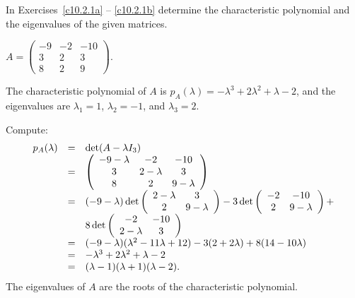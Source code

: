 \documentclass{ximera}
\begin{document}
\noindent In Exercises~\ref{c10.2.1a} -- \ref{c10.2.1b} determine the 
characteristic polynomial and the eigenvalues of the given matrices.
\begin{exercise} \label{c10.2.1a}
$A = \left(\begin{array}{rrr} -9 & -2 & -10 \\ 3 & 2 & 3 \\
8 & 2 & 9 \end{array}\right)$. 

\begin{solution}

\ans The characteristic polynomial of $A$ is $p_A(\lambda) =
-\lambda^3 + 2\lambda^2 + \lambda - 2$, and the eigenvalues are
$\lambda_1 = 1$, $\lambda_2 = -1$, and $\lambda_3 = 2$.

\soln Compute:
\[
\begin{array}{rcl}
p_A(\lambda) & = & \det(A - \lambda I_3) \\
& = & \left(\begin{array}{ccc} -9 - \lambda & -2 & -10 \\ 3 & 2 - \lambda & 3 \\ 8 & 2 & 9 - \lambda\end{array}\right) \\
& = & (-9 - \lambda)\det\left(\begin{array}{cc} 2 - \lambda & 3\\ 2 &9 - \lambda\end{array}\right)
- 3\det\left(\begin{array}{cc} -2 & -10\\ 2 &9 - \lambda\end{array}\right) + \\
& & 8\det\left(\begin{array}{cc} -2 & -10\\ 2 - \lambda &3\end{array}\right) \\
& = & (-9 - \lambda)(\lambda^2 - 11\lambda + 12)
- 3(2 + 2\lambda) + 8(14 - 10\lambda) \\
& = & -\lambda^3 + 2\lambda^2 + \lambda - 2 \\
& = & (\lambda - 1)(\lambda + 1)(\lambda - 2). \end{array}
\]
The eigenvalues of $A$ are the roots of the characteristic polynomial.

\end{solution}
\end{exercise}
\end{document}
